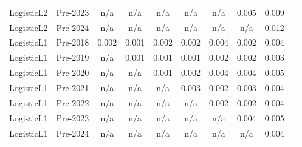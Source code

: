 \begin{table}[H]
{\begin{tabular}{ll cccccccc}
LogisticL2 & Pre-2023 & n/a & n/a & n/a & n/a & n/a & 0.005 & 0.009 \\
LogisticL2 & Pre-2024 & n/a & n/a & n/a & n/a & n/a & n/a & 0.012 \\
\midrule
LogisticL1 & Pre-2018 & 0.002 & 0.001 & 0.002 & 0.002 & 0.004 & 0.002 & 0.004 \\
LogisticL1 & Pre-2019 & n/a & 0.001 & 0.001 & 0.001 & 0.002 & 0.002 & 0.003 \\
LogisticL1 & Pre-2020 & n/a & n/a & 0.001 & 0.002 & 0.004 & 0.004 & 0.005 \\
LogisticL1 & Pre-2021 & n/a & n/a & n/a & 0.003 & 0.002 & 0.003 & 0.004 \\
LogisticL1 & Pre-2022 & n/a & n/a & n/a & n/a & 0.002 & 0.002 & 0.004 \\
LogisticL1 & Pre-2023 & n/a & n/a & n/a & n/a & n/a & 0.004 & 0.005 \\
LogisticL1 & Pre-2024 & n/a & n/a & n/a & n/a & n/a & n/a & 0.004 \\
\bottomrule
\end{tabular}%
}
\end{table}